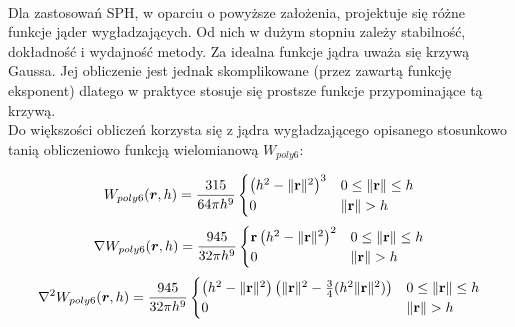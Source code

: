 \paragraph{}
Dla zastosowań SPH, w oparciu o powyższe założenia, projektuje się różne funkcje jąder wygładzających. Od nich w dużym stopniu zależy stabilność, dokładność i wydajność metody. Za idealna funkcje jądra uważa się krzywą Gaussa. Jej obliczenie jest jednak skomplikowane (przez zawartą funkcję eksponent) dlatego w praktyce stosuje się prostsze funkcje przypominające tą krzywą.\\
\indent Do większości obliczeń korzysta się z jądra wygładzającego opisanego stosunkowo tanią obliczeniowo funkcją wielomianową $W_{poly6}$:

\begin{equation}
W_{poly6}(\boldsymbol{r}, h) = {315 \over 64 \pi h^9}
\begin{cases}
\left(h^2 - \| \mathbf{r} \|^2\right)^3 & 0 \le \| \mathbf{r} \| \le h \\
0 & \| \mathbf{r} \| > h
\end{cases}
\end{equation}
\begin{equation}
\nabla W_{poly6}(\boldsymbol{r}, h) = {945 \over 32 \pi h^9}
\begin{cases}
\mathbf{r} \left(h^2 - \| \mathbf{r} \|^2\right)^2 & 0 \le \| \mathbf{r} \| \le h \\
0 & \| \mathbf{r} \| > h
\end{cases}
\end{equation}
\begin{equation}
\nabla^2 W_{poly6}(\boldsymbol{r}, h) = {945 \over 32 \pi h^9}
\begin{cases}
\left(h^2 - \| \mathbf{r} \|^2\right)\left(\| \mathbf{r} \|^2 - {3 \over 4}(h^2 \| \mathbf{r} \|^2)\right) & 0 \le \| \mathbf{r} \| \le h \\
0 & \| \mathbf{r} \| > h
\end{cases}
\end{equation}

